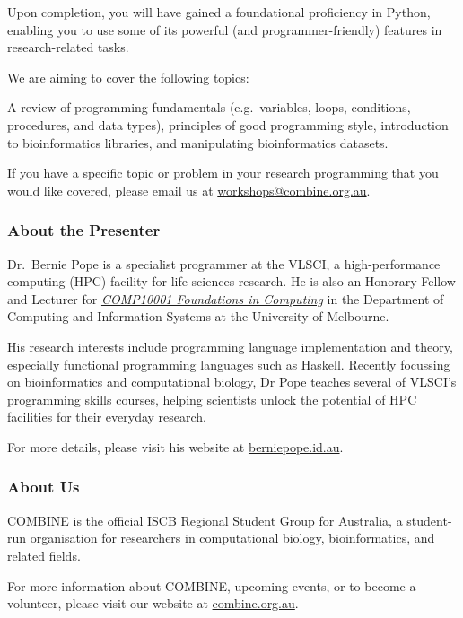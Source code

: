 \documentclass[12pt,]{article}
\begin{document}
Upon completion, you will have gained a foundational proficiency in
Python, enabling you to use some of its powerful (and
programmer-friendly) features in research-related tasks.

We are aiming to cover the following topics:

A review of programming fundamentals (e.g.~variables, loops, conditions,
procedures, and data types), principles of good programming style,
introduction to bioinformatics libraries, and manipulating
bioinformatics datasets.

If you have a specific topic or problem in your research programming
that you would like covered, please email us at
\href{mailto:workshops@combine.org.au}{workshops@combine.org.au}.

\subsubsection{About the Presenter}

Dr.~Bernie Pope is a specialist programmer at the VLSCI, a
high-performance computing (HPC) facility for life sciences research. He
is also an Honorary Fellow and Lecturer for
\emph{\href{https://handbook.unimelb.edu.au/view/2013/COMP10001}{COMP10001
Foundations in Computing}} in the Department of Computing and
Information Systems at the University of Melbourne.

His research interests include programming language implementation and
theory, especially functional programming languages such as Haskell.
Recently focussing on bioinformatics and computational biology, Dr Pope
teaches several of VLSCI's programming skills courses, helping
scientists unlock the potential of HPC facilities for their everyday
research.

For more details, please visit his website at
\href{http://www.berniepope.id.au}{berniepope.id.au}.

\subsubsection{About Us}

\href{http://www.combine.org.au}{COMBINE} is the official
\href{http://www.iscbsc.org/content/regional-student-groups}{ISCB
Regional Student Group} for Australia, a student-run organisation for
researchers in computational biology, bioinformatics, and related
fields.

For more information about COMBINE, upcoming events, or to become a
volunteer, please visit our website at
\href{http://www.combine.org.au}{combine.org.au}.
\end{document}
